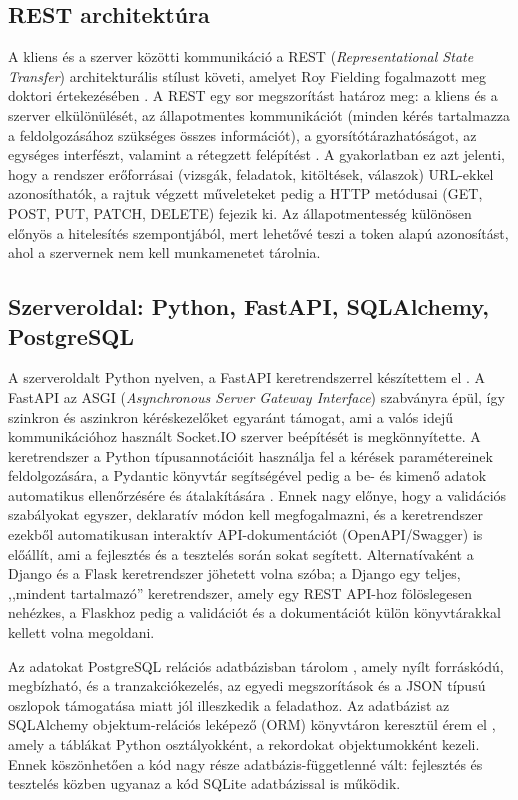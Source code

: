 \subsection{REST architektúra}

A kliens és a szerver közötti kommunikáció a REST (\textit{Representational State Transfer})
architekturális stílust követi, amelyet Roy Fielding fogalmazott meg doktori értekezésében
\cite{fielding2000architectural}. A REST egy sor megszorítást határoz meg: a kliens és a szerver
elkülönülését, az állapotmentes kommunikációt (minden kérés tartalmazza a feldolgozásához
szükséges összes információt), a gyorsítótárazhatóságot, az egységes interfészt, valamint a
rétegzett felépítést \cite{fielding2000architectural}. A gyakorlatban ez azt jelenti, hogy a
rendszer erőforrásai (vizsgák, feladatok, kitöltések, válaszok) URL-ekkel azonosíthatók, a rajtuk
végzett műveleteket pedig a HTTP metódusai (GET, POST, PUT, PATCH, DELETE) fejezik ki. Az
állapotmentesség különösen előnyös a hitelesítés szempontjából, mert lehetővé teszi a
token alapú azonosítást, ahol a szervernek nem kell munkamenetet tárolnia.

\subsection{Szerveroldal: Python, FastAPI, SQLAlchemy, PostgreSQL}

A szerveroldalt Python nyelven, a FastAPI keretrendszerrel készítettem el \cite{fastapi_docs}. A
FastAPI az ASGI (\textit{Asynchronous Server Gateway Interface}) szabványra épül, így szinkron és
aszinkron kéréskezelőket egyaránt támogat, ami a valós idejű kommunikációhoz használt Socket.IO
szerver beépítését is megkönnyítette. A keretrendszer a Python típusannotációit használja fel a
kérések paramétereinek feldolgozására, a Pydantic könyvtár segítségével pedig a be- és kimenő
adatok automatikus ellenőrzésére és átalakítására \cite{pydantic_docs}. Ennek nagy előnye, hogy a
validációs szabályokat egyszer, deklaratív módon kell megfogalmazni, és a keretrendszer ezekből
automatikusan interaktív API-dokumentációt (OpenAPI/Swagger) is előállít, ami a fejlesztés és a
tesztelés során sokat segített. Alternatívaként a Django és a Flask keretrendszer jöhetett
volna szóba; a Django egy teljes, ,,mindent tartalmazó'' keretrendszer, amely egy REST API-hoz
fölöslegesen nehézkes, a Flaskhoz pedig a validációt és a dokumentációt külön könyvtárakkal
kellett volna megoldani.

Az adatokat PostgreSQL relációs adatbázisban tárolom \cite{postgresql_docs}, amely nyílt forráskódú,
megbízható, és a tranzakciókezelés, az egyedi megszorítások és a JSON típusú oszlopok
támogatása miatt jól illeszkedik a feladathoz. Az adatbázist az SQLAlchemy objektum-relációs
leképező (ORM) könyvtáron keresztül érem el \cite{sqlalchemy_docs}, amely a táblákat Python
osztályokként, a rekordokat objektumokként kezeli. Ennek köszönhetően a kód nagy része
adatbázis-függetlenné vált: fejlesztés és tesztelés közben ugyanaz a kód SQLite adatbázissal is
működik.

